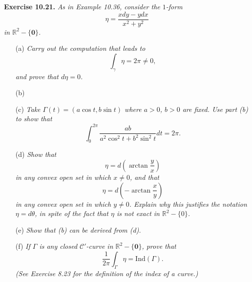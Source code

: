\documentclass{article}
\begin{document}



\textbf{Exercise 10.21.}
\emph{As in Example 10.36, consider the $1$-form
\[
  \eta = \frac{x dy - y dx}{x^2+y^2}
\]
in $\mathbb{R}^2-\{\mathbf{0}\}$.}
\begin{enumerate}
\item[(a)]
  \emph{Carry out the computation that leads to
  \[
    \int_{\gamma} \eta = 2\pi \neq 0,
  \]
  and prove that $d\eta = 0$.}

\item[(b)]

\item[(c)]
  \emph{Take $\Gamma(t) = (a\cos t, b\sin t)$ where $a > 0$, $b > 0$ are fixed.
  Use part (b) to show that}
  \[
    \int_{0}^{2\pi} \frac{ab}{a^2\cos^2 t + b^2 \sin^2 t}dt = 2\pi.
  \]

\item[(d)]
  \emph{Show that
  \[
    \eta = d\left( \arctan\frac{y}{x} \right)
  \]
  in any convex open set in which $x \neq 0$, and that
  \[
    \eta = d\left( -\arctan\frac{x}{y} \right)
  \]
  in any convex open set in which $y \neq 0$.
  Explain why this justifies the notation $\eta = d\theta$,
  in spite of the fact that $\eta$ is not exact in $\mathbb{R}^2 - \{0\}$.}

\item[(e)]
  \emph{Show that (b) can be derived from (d).}

\item[(f)]
  \emph{If $\Gamma$ is any closed $\mathscr{C}'$-curve in $\mathbb{R}^2 - \{ \mathbf{0} \}$,
  prove that
  \[
    \frac{1}{2\pi} \int_{\Gamma} \eta = \mathrm{Ind}(\Gamma).
  \]
  (See Exercise 8.23 for the definition of the index of a curve.)} \\
\end{enumerate}
\end{document}
